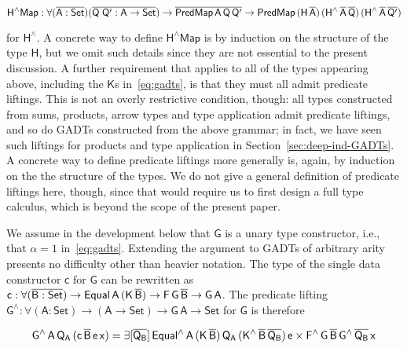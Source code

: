 \documentclass[9pt]{entcs}
\begin{document}
\vspace*{-0.05in}

\[\mathsf{H^\wedge Map : \forall (\overline{A : Set}) (\overline{Q\;Q' : A \to Set}) 
\to \overline{PredMap\,A\,Q\,Q'} \to
PredMap\,(H\,\overline{A})\,(H^{\wedge}\,\overline{A}\,\overline{Q})\, 
(H^{\wedge}\,\overline{A}\,\overline{Q'})}\]

\vspace*{0.05in}

\noindent
for $\mathsf{H^{\wedge}}$.  A concrete way to define $\mathsf{H^\wedge
  Map}$ is by induction on the structure of the type $\mathsf{H}$, but
we omit such details since they are not essential to the present
discussion. A further requirement that applies to all of the types
appearing above, including the $\mathsf{K}$s in~\eqref{eq:gadts}, is
that they must all admit predicate liftings. This is not an overly
restrictive condition, though: all types constructed from sums,
products, arrow types and type application admit predicate liftings,
and so do GADTs constructed from the above grammar; in fact, we have
seen such liftings for products and type application in
Section~\ref{sec:deep-ind-GADTs}.  A concrete way to define predicate
liftings more generally is, again, by induction on the the structure
of the types. We do not give a general definition of predicate
liftings here, though, since that would require us to first design a
full type calculus, which is beyond the scope of the present paper.

We assume in the development below that $\mathsf{G}$ is a unary type
constructor, i.e., that $\alpha = 1$ in~\eqref{eq:gadts}. Extending
the argument to GADTs of arbitrary arity presents no difficulty other
than heavier notation. The type of the single data constructor
$\mathsf{c}$ for $\mathsf{G}$ can be rewritten as $\mathsf{c : \forall
  (\overline{B : Set}) \to Equal\,A\,(K\,\overline{B}) \to F\,G\,\overline{B} \to
  G\,A}$. The predicate lifting $\mathsf{G^{\wedge} : \forall (A :
  Set) \to (A \to Set) \to G\,A \to Set}$ for $\mathsf{G}$ is
therefore

\vspace*{-0.05in}

\[\mathsf{G^{\wedge}\,A\,Q_A\,(c\,\overline{B}\,e\,x)
= \exists [\overline{Q_B}]\,
Equal^{\wedge}\,A\,(K\,\overline{B})\,Q_A\,(K^{\wedge}\,\overline{B}\,\overline{Q_B})\,e
\times F^{\wedge}\,G\,\overline{B}\,G^{\wedge}\,{\overline{Q_B}}\,x}\]
\end{document}
